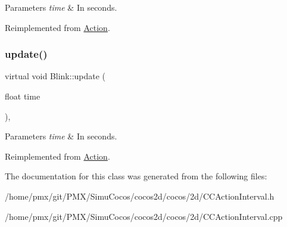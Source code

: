\begin{DoxyParams}{Parameters}
{\em time} & In seconds. \\
\hline
\end{DoxyParams}


Reimplemented from \hyperlink{classAction_a937e646e63915e33ad05ba149bfcf239}{Action}.

\mbox{\label{classBlink_aa9e0a219061963eecfa5b8193f2780f2}} 
\subsubsection{\texorpdfstring{update()}{update()}\hspace{0.1cm}{\footnotesize\ttfamily [2/2]}}
{\footnotesize\ttfamily virtual void Blink\+::update (\begin{DoxyParamCaption}\item[{float}]{time }\end{DoxyParamCaption})\hspace{0.3cm}{\ttfamily [override]}, {\ttfamily [virtual]}}


\begin{DoxyParams}{Parameters}
{\em time} & In seconds. \\
\hline
\end{DoxyParams}


Reimplemented from \hyperlink{classAction_a937e646e63915e33ad05ba149bfcf239}{Action}.



The documentation for this class was generated from the following files\+:\begin{DoxyCompactItemize}
\item 
/home/pmx/git/\+P\+M\+X/\+Simu\+Cocos/cocos2d/cocos/2d/C\+C\+Action\+Interval.\+h\item 
/home/pmx/git/\+P\+M\+X/\+Simu\+Cocos/cocos2d/cocos/2d/C\+C\+Action\+Interval.\+cpp\end{DoxyCompactItemize}
